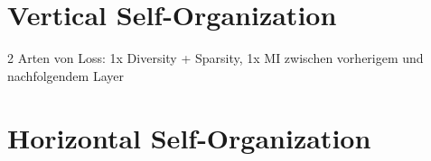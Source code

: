 \section{Vertical Self-Organization}
2 Arten von Loss: 1x Diversity + Sparsity, 1x MI zwischen vorherigem und nachfolgendem Layer

\section{Horizontal Self-Organization}